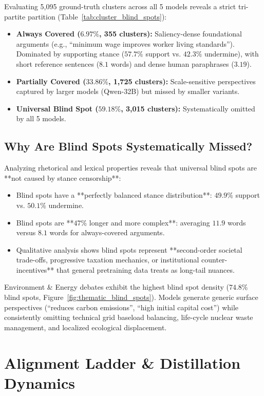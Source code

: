 \documentclass[11pt,a4paper]{article}
\begin{document}
Evaluating 5,095 ground-truth clusters across all 5 models reveals a strict tri-partite partition (Table~\ref{tab:cluster_blind_spots}):
\begin{itemize}
    \item \textbf{Always Covered ($6.97\%$, 355 clusters):} Saliency-dense foundational arguments (e.g., ``minimum wage improves worker living standards''). Dominated by supporting stance ($57.7\%$ support vs. $42.3\%$ undermine), with short reference sentences ($8.1$ words) and dense human paraphrases ($3.19$).
    \item \textbf{Partially Covered ($33.86\%$, 1,725 clusters):} Scale-sensitive perspectives captured by larger models (Qwen-32B) but missed by smaller variants.
    \item \textbf{Universal Blind Spot ($59.18\%$, 3,015 clusters):} Systematically omitted by all 5 models.
\end{itemize}

\subsection{Why Are Blind Spots Systematically Missed?}
Analyzing rhetorical and lexical properties reveals that universal blind spots are **not caused by stance censorship**:
\begin{itemize}
    \item Blind spots have a **perfectly balanced stance distribution**: $49.9\%$ support vs. $50.1\%$ undermine.
    \item Blind spots are **$47\%$ longer and more complex**: averaging $11.9$ words versus $8.1$ words for always-covered arguments.
    \item Qualitative analysis shows blind spots represent **second-order societal trade-offs, progressive taxation mechanics, or institutional counter-incentives** that general pretraining data treats as long-tail nuances.
\end{itemize}

Environment \& Energy debates exhibit the highest blind spot density ($\mathbf{74.8\%}$ blind spots, Figure~\ref{fig:thematic_blind_spots}). Models generate generic surface perspectives (``reduces carbon emissions'', ``high initial capital cost'') while consistently omitting technical grid baseload balancing, life-cycle nuclear waste management, and localized ecological displacement.

\section{Alignment Ladder & Distillation Dynamics}
\end{document}
